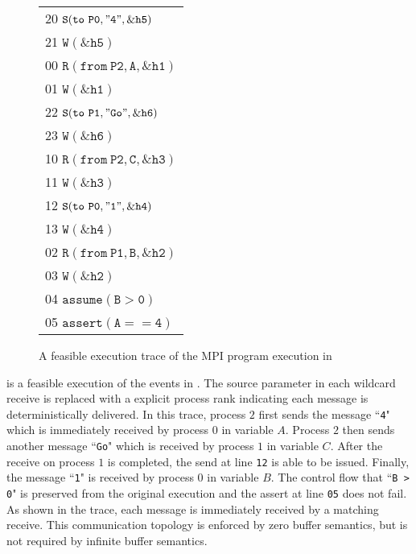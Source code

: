 \begin{figure}[b]
\begin{center}
\setlength{\tabcolsep}{2pt}
\small \begin{tabular}[t]{l}
20 $\mathtt{S(to\ P0, "4", \&h5)}$ \\
21 $\mathtt{W(\&h5)}$\\
\hline
00 $\mathtt{R(from\ P2, A, \&h1)}$ \\
01 $\mathtt{W(\&h1)}$ \\
\hline
22 $\mathtt{S(to\ P1, "Go", \&h6)}$ \\
23 $\mathtt{W(\&h6)}$ \\
\hline
10 $\mathtt{R(from\ P2, C, \&h3)}$ \\
11 $\mathtt{W(\&h3)}$ \\
12 $\mathtt{S(to\ P0, "1", \&h4)}$ \\
13 $\mathtt{W(\&h4)}$ \\
\hline
02 $\mathtt{R(from\ P1, B, \&h2)}$ \\
03 $\mathtt{W(\&h2)}$ \\
04 $\mathtt{assume(B > 0)}$ \\
05 $\mathtt{assert(A == 4)}$ \\
\hline
\end{tabular}
\end{center}
\caption{A feasible execution trace of the MPI program execution in }
\label{fig:trace1}
\end{figure}

 is a feasible execution of the events in . The source parameter in each wildcard receive is replaced with a explicit process rank indicating each message is deterministically delivered. In this trace, process $2$ first sends the message ``\texttt{4}" which is immediately received by process $0$ in variable $A$. Process $2$ then sends another message ``\texttt{Go}" which is received by process $1$ in variable $C$. After the receive on process $1$ is completed, the send at line \texttt{12} is able to be issued. Finally, the message ``\texttt{1}" is received by process $0$ in variable $B$. The control flow that ``\texttt{B > 0}" is preserved from the original execution and the assert at line \texttt{05} does not fail. As shown in the trace, each message is immediately received by a matching receive. This communication topology is enforced by zero buffer semantics, but is not required by infinite buffer semantics.

